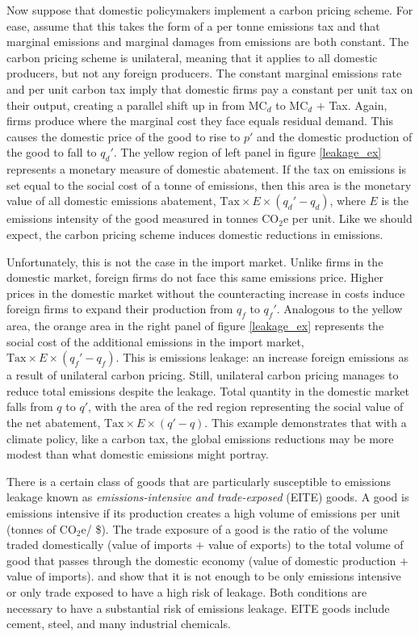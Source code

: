Now suppose that domestic policymakers implement a carbon pricing scheme. For ease, assume that this takes the form of a per tonne emissions tax and that marginal emissions and marginal damages from emissions are both constant. The carbon pricing scheme is unilateral, meaning that it applies to all domestic producers, but not any foreign producers. The constant marginal emissions rate and per unit carbon tax imply that domestic firms pay a constant per unit tax on their output, creating a parallel shift up in from MC$_d$ to MC$_d$ $+$ Tax. Again, firms produce where the marginal cost they face equals residual demand. This causes the domestic price of the good to rise to $p'$ and the domestic production of the good to fall to $q_d'$. The yellow region of left panel in figure \ref{leakage_ex} represents a monetary measure of domestic abatement. If the tax on emissions is set equal to the social cost of a tonne of emissions, then this area is the monetary value of all domestic emissions abatement, $\text{Tax} \times E \times (q_d' - q_d)$, where $E$ is the emissions intensity of the good measured in tonnes CO$_2$e per unit. Like we should expect, the carbon pricing scheme induces domestic reductions in emissions.

Unfortunately, this is not the case in the import market. Unlike firms in the domestic market, foreign firms do not face this same emissions price. Higher prices in the domestic market without the counteracting increase in costs induce foreign firms to expand their production from $q_f$ to $q_f'$. Analogous to the yellow area, the orange area in the right panel of figure \ref{leakage_ex} represents the social cost of the additional emissions in the import market, $\text{Tax} \times E \times (q_f' - q_f)$. This is emissions leakage: an increase foreign emissions as a result of unilateral carbon pricing. Still, unilateral carbon pricing manages to reduce total emissions despite the leakage. Total quantity in the domestic market falls from $q$ to $q'$, with the area of the red region representing the social value of the net abatement, $\text{Tax} \times E \times (q' - q)$. This example demonstrates that with a climate policy, like a carbon tax, the global emissions reductions may be more modest than what domestic emissions might portray. 

There is a certain class of goods that are particularly susceptible to emissions leakage known as \emph{emissions-intensive and trade-exposed} (EITE) goods. A good is emissions intensive if its production creates  a high volume of emissions per unit (tonnes of CO$_2$e/ \$). The trade exposure of a good is the ratio of the volume traded domestically (value of imports $+$ value of exports) to the total volume of good that passes through the domestic economy (value of domestic production $+$ value of imports). \cite{fowlie2022mitigating} and \cite{fowlie2016measuring} show that it is not enough to be only emissions intensive or only trade exposed to have a high risk of leakage. Both conditions are necessary to have a substantial risk of emissions leakage. EITE goods include cement, steel, and many industrial chemicals.

